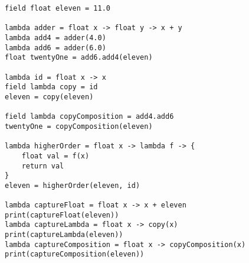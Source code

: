 \begin{lstlisting}[emph={field,float,lambda},emphstyle={\textbf},caption={The syntax of lambda expressions in \emph{Scandal}.},label={alg:lambdas}]
field float eleven = 11.0

lambda adder = float x -> float y -> x + y
lambda add4 = adder(4.0)
lambda add6 = adder(6.0)
float twentyOne = add6.add4(eleven)

lambda id = float x -> x
field lambda copy = id
eleven = copy(eleven)

field lambda copyComposition = add4.add6
twentyOne = copyComposition(eleven)

lambda higherOrder = float x -> lambda f -> {
	float val = f(x)
	return val
}
eleven = higherOrder(eleven, id)

lambda captureFloat = float x -> x + eleven
print(captureFloat(eleven))
lambda captureLambda = float x -> copy(x)
print(captureLambda(eleven))
lambda captureComposition = float x -> copyComposition(x)
print(captureComposition(eleven))
\end{lstlisting}

